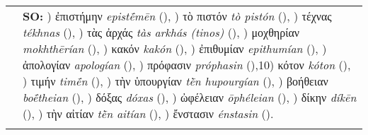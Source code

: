 \documentclass[output=paper,colorlinks,citecolor=brown]{langscibook}
\begin{document}
\begin{table}
\begin{tabularx}{\textwidth}{QQ}
&

\textbf{SO:}
) ἐπιστήμην \textit{epistḗmēn} (),
) τὸ πιστόν \textit{tò pistón} (),
) τέχνας \textit{tékhnas} (),
) τὰς ἀρχάς \textit{tàs arkhás (tinos)} (),
) μοχθηρίαν \textit{mokhthērían} (),
) κακόν \textit{kakón} (),
) ἐπιθυμίαν \textit{epithumían} (),
) ἀπολογίαν \textit{apologían} (),
) πρόφασιν \textit{próphasin} (),10) κότον \textit{kóton} (),
) τιμήν \textit{timḗn} (),
) τὴν ὑπουργίαν \textit{tḕn hupourgían} (),
) βοήθειαν \textit{boḗtheian} (),
) δόξας \textit{dóxas} (),
) ὠφέλειαν \textit{ōphéleian} (),
) δίκην \textit{díkēn} (),
) τὴν αἰτίαν \textit{tḕn aitían} (),
) ἔνστασιν \textit{énstasin} (). \\
\lspbottomrule
\end{tabularx}
\end{table}
\end{document}
